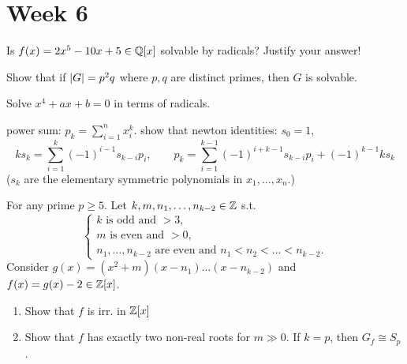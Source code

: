 
\section{Week 6}

\begin{exercise}
  Is $f(x) = 2x^5 - 10x + 5 \in \mathbb{Q}[x]$ solvable by radicals? Justify your
  answer!
\end{exercise}

\begin{exercise}
  Show that if $\lvert G\rvert = p^2 q$ where $p, q$ are distinct primes, then
  $G$ is solvable.
\end{exercise}

\begin{exercise}
  Solve $x^4 + ax + b = 0$ in terms of radicals.
\end{exercise}

\begin{exercise}
  power sum: $\displaystyle p_k = \sum_{i=1}^n x_i^k$.
  show that newton identities: $s_0 = 1$,
  \[
    ks_k = \sum_{i=1}^k (-1)^{i-1} s_{k-i}p_i, \qquad
    p_k = \sum_{i=1}^{k-1}(-1)^{i+k-1} s_{k-i}p_i + (-1)^{k-1}ks_k
  \]
  ($s_k$ are the elementary symmetric polynomials in $x_1, \dots, x_n$.)
\end{exercise}

\begin{exercise}
  For any prime $p \ge 5$.
  Let $k, m, n_1, \dots, n_{k-2} \in \mathbb{Z}$ s.t.
  \[
    \begin{cases}
      k \text{~is odd and~} > 3, \\
      m \text{~is even and~} > 0, \\
      n_1, \dots, n_{k-2} \text{~are even and~} n_1 < n_2 < \dots < n_{k-2}.
    \end{cases}
  \]
  Consider $g(x) = (x^2+m)(x-n_1)\dots(x-n_{k-2})$ and
  $f(x) = g(x)-2 \in \mathbb{Z}[x]$.
  \begin{enumerate}
    \item Show that $f$ is irr. in $\mathbb{Z}[x]$
    \item Show that $f$ has exactly two non-real roots for $m \gg 0$.
      If $k = p$, then $G_f \cong S_p$.
  \end{enumerate}
\end{exercise}

